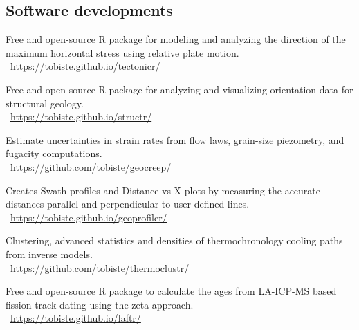 \documentclass[10pt, paper=letter]{scrartcl} %
\begin{document}
\begin{cv}{}
    \section{Software developments}
    \begin{cvlist}{}
        \item[\texttt{tectonicr}] Free and open-source R package for modeling and analyzing the direction of the maximum horizontal stress using relative plate motion.\\
         \textbar \faLink~\url{https://tobiste.github.io/tectonicr/}
        \item[\texttt{structr}] Free and open-source R package for analyzing and visualizing orientation data for structural geology.\\
        \faLink~\url{https://tobiste.github.io/structr/}
        
        \item[\texttt{geocreep}] Estimate uncertainties in strain rates from flow laws, grain-size piezometry, and fugacity computations.\\
        \faLink~\url{https://github.com/tobiste/geocreep/}
        
        \item[\texttt{geoprofiler}] Creates Swath profiles and Distance vs X plots by measuring the accurate distances parallel and perpendicular to user-defined lines.\\
         \textbar \faLink~\url{https://tobiste.github.io/geoprofiler/}
       
        \item[\texttt{thermoclustr}] Clustering, advanced statistics and densities of thermochronology cooling paths from inverse models.\\
        \faLink~\url{https://github.com/tobiste/thermoclustr/}
        
         \item[\texttt{laftr}] Free and open-source R package to calculate the ages from LA-ICP-MS based fission track dating using the zeta approach.\\
         \faLink~\url{https://tobiste.github.io/laftr/}
    \end{cvlist}


\end{cv}
\end{document}
